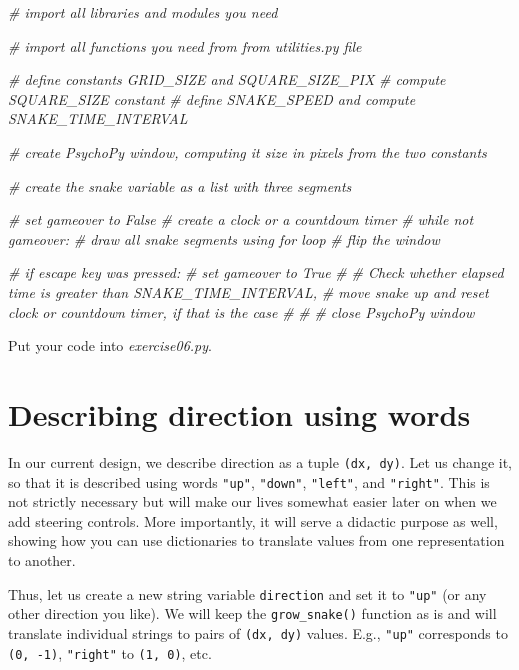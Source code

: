 \documentclass[
]{book}
\newenvironment{Shaded}{\begin{snugshade}}{\end{snugshade}}
\newcommand{\CommentTok}[1]{\textcolor[rgb]{0.56,0.35,0.01}{\textit{#1}}}
\begin{document}
\begin{Shaded}
\begin{Highlighting}[]
\CommentTok{\# import all libraries and modules you need}

\CommentTok{\# import all functions you need from from utilities.py file}

\CommentTok{\# define constants GRID\_SIZE and SQUARE\_SIZE\_PIX}
\CommentTok{\# compute SQUARE\_SIZE constant}
\CommentTok{\# define SNAKE\_SPEED and compute SNAKE\_TIME\_INTERVAL}

\CommentTok{\# create PsychoPy window, computing it size in pixels from the two constants}

\CommentTok{\# create the snake variable as a list with three segments}

\CommentTok{\# set gameover to False}
\CommentTok{\# create a clock or a countdown timer}
\CommentTok{\# while not gameover:}
\CommentTok{\#     draw all snake segments using for loop  }
\CommentTok{\#     flip the window}

\CommentTok{\#     if escape key was pressed:}
\CommentTok{\#         set gameover to True}
\CommentTok{\#}
\CommentTok{\#     Check whether elapsed time is greater than SNAKE\_TIME\_INTERVAL, }
\CommentTok{\#         move snake up and reset clock or countdown timer, if that is the case}
\CommentTok{\#}
\CommentTok{\#}
\CommentTok{\# close PsychoPy window}
\end{Highlighting}
\end{Shaded}

Put your code into \emph{exercise06.py}.

\hypertarget{describing-direction-using-words}{%
\section{Describing direction using words}\label{describing-direction-using-words}}

In our current design, we describe direction as a tuple \texttt{(dx,\ dy)}. Let us change it, so that it is described using words \texttt{"up"}, \texttt{"down"}, \texttt{"left"}, and \texttt{"right"}. This is not strictly necessary but will make our lives somewhat easier later on when we add steering controls. More importantly, it will serve a didactic purpose as well, showing how you can use dictionaries to translate values from one representation to another.

Thus, let us create a new string variable \texttt{direction} and set it to \texttt{"up"} (or any other direction you like). We will keep the \texttt{grow\_snake()} function as is and will translate individual strings to pairs of \texttt{(dx,\ dy)} values. E.g., \texttt{"up"} corresponds to \texttt{(0,\ -1)}, \texttt{"right"} to \texttt{(1,\ 0)}, etc.
\end{document}
